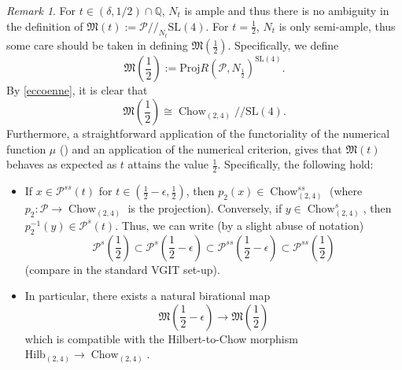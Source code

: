 \documentclass[11pt]{amsart}
\numberwithin{equation}{section}
\theoremstyle{plain}
\theoremstyle{remark}
\newtheorem{remark}[theorem]{Remark}
\theoremstyle{definition}
\newcommand{\Hilb}{\mathrm{Hilb}}
\newcommand{\SL}{\mathrm{SL}}
\newcommand{\Proj}{\mathrm{Proj}}
\newcommand{\gquot}{/\!\!/}
\newcommand{\cP}{{\mathscr P}}
\newcommand{\gM}{\mathfrak{M}}
\newcommand{\QQ}{{\mathbb Q}}
\DeclareMathOperator{\Chow}{Chow}
\begin{document}
\begin{remark}\label{rmk:defgit12}
For $t\in(\delta,1/2)\cap\QQ$, $N_t$ is ample and thus there is no ambiguity in the definition of $\gM(t):=\cP\gquot_{N_t}\SL(4)$. For $t=\frac{1}{2}$, $N_{t}$ is only semi-ample, thus some care should be taken in defining $\gM(\frac{1}{2})$. Specifically, we define
$$\gM\left(\frac{1}{2}\right):=\Proj R\left(\cP, N_{\frac{1}{2}}\right)^{\SL(4)}.$$
By  \eqref{eccoenne}, it is clear that 
\begin{equation}\label{m12chow}
\gM\left(\frac{1}{2}\right)\cong \Chow_{(2,4)}\gquot \SL(4).
\end{equation}
Furthermore, a straightforward application of the functoriality of the numerical function $\mu$ (\cite[p. 49]{GIT}) and an application of the numerical criterion, gives that $\gM(t)$ behaves as expected as $t$ attains the value $\frac{1}{2}$. Specifically, the following hold:
\begin{itemize}
\item[i)] If $x\in \cP^{ss}(t)$ for $t\in\left(\frac{1}{2}-\epsilon,\frac{1}{2}\right)$, then $p_2(x)\in \Chow_{(2,4)}^{ss}$ (where $p_2:\cP\to \Chow_{(2,4)}$ is the projection). Conversely, if $y\in \Chow_{(2,4)}^{s}$, then $p_2^{-1}(y)\in \cP^{s}(t)$. Thus, we can write (by a slight abuse of notation)
$$\cP^s\left(\frac{1}{2}\right)\subset \cP^{s}\left(\frac{1}{2}-\epsilon\right)\subset \cP^{ss}\left(\frac{1}{2}-\epsilon\right)\subset \cP^{ss}\left(\frac{1}{2}\right)$$
(compare \cite[(3.18)]{VGIT} in the standard VGIT set-up). 
\item[ii)] In particular, there exists a natural birational map 
\begin{equation}
\gM\left(\frac{1}{2}-\epsilon\right)\to \gM\left(\frac{1}{2}\right)
\end{equation}
which is compatible with the Hilbert-to-Chow morphism $\Hilb_{(2,4)}\to \Chow_{(2,4)}$. 
\end{itemize} 
\end{remark}
 
\end{document}
